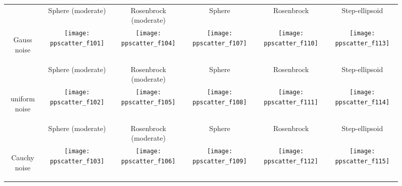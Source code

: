 \documentclass{sig-alternate}
\begin{document}
\begin{figure*}
\small
\centering
\begin{tabular}{@{}c@{}*{5}{@{}c@{}}}
 & { Sphere (moderate)} & { Rosenbrock (moderate)} & { Sphere} & { Rosenbrock} & { Step-ellipsoid} \\
\begin{turn}{90}\parbox{0.175\textwidth}{\centering\sf Gauss noise}\end{turn} &
    \texttt{[image: ppscatter\_f101]}&
    \texttt{[image: ppscatter\_f104]}&
    \texttt{[image: ppscatter\_f107]}&
    \texttt{[image: ppscatter\_f110]}&
    \texttt{[image: ppscatter\_f113]}\\
 & { Sphere (moderate)} & { Rosenbrock (moderate)} & { Sphere} & { Rosenbrock} & { Step-ellipsoid}\\
\begin{turn}{90}\parbox{0.175\textwidth}{\centering\sf uniform noise}\end{turn} &
    \texttt{[image: ppscatter\_f102]}&
    \texttt{[image: ppscatter\_f105]}&
    \texttt{[image: ppscatter\_f108]}&
    \texttt{[image: ppscatter\_f111]}&
    \texttt{[image: ppscatter\_f114]}\\
 & { Sphere (moderate)} & { Rosenbrock (moderate)} & { Sphere} & { Rosenbrock} & { Step-ellipsoid}\\
\begin{turn}{90}\parbox{0.175\textwidth}{\centering\sf Cauchy noise}\end{turn} &
    \texttt{[image: ppscatter\_f103]}&
    \texttt{[image: ppscatter\_f106]}&
    \texttt{[image: ppscatter\_f109]}&
    \texttt{[image: ppscatter\_f112]}&
    \texttt{[image: ppscatter\_f115]}\\\hline

\end{tabular}
\end{figure*}
\end{document}
